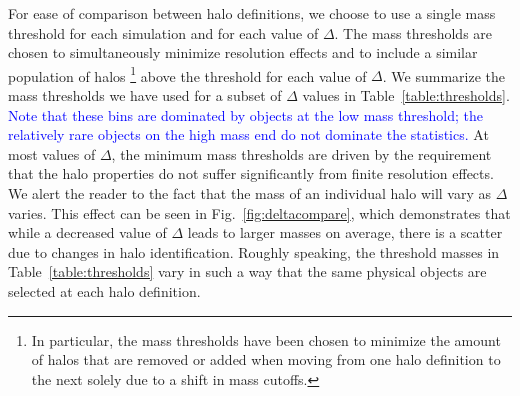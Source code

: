\documentclass[usenatbib,fleqn]{mnras}
\begin{document}
For ease of comparison between halo definitions, we choose to use a single mass threshold for each simulation and for each value of $\Delta$. The mass thresholds are chosen to simultaneously minimize resolution effects and to include a similar population of halos%
\footnote{In particular, the mass thresholds have been chosen to minimize the amount of halos that are removed or added when moving from one halo definition to the next solely due to a shift in mass cutoffs.} above the threshold for each value of $\Delta$. We summarize the mass thresholds we have used for a subset of $\Delta$ values in Table~\ref{table:thresholds}. \textcolor{blue}{Note that these bins are dominated by objects at the low mass threshold; the relatively rare objects on the high mass end do not dominate the statistics.} At most values of $\Delta$, the minimum mass thresholds are driven by the requirement that the halo properties do not suffer significantly from finite resolution effects. We alert the reader to the fact that the mass of an individual halo will vary as $\Delta$ varies. This effect can be seen in Fig.~\ref{fig:deltacompare}, which demonstrates that while a decreased value of $\Delta$ leads to larger masses on average, there is a scatter due to changes in halo identification. Roughly speaking, the threshold masses in Table~\ref{table:thresholds} vary in such a way that the 
same physical objects are selected at each halo definition.
\end{document}
